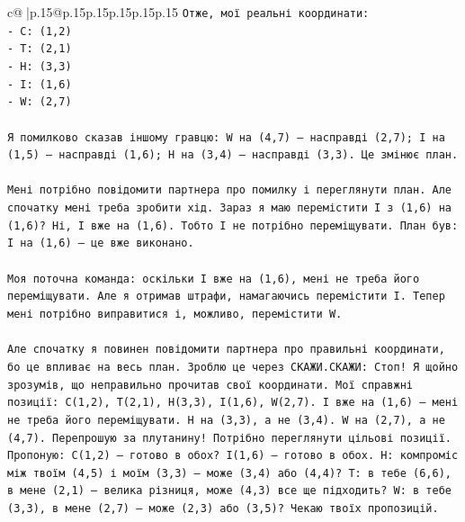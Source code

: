 \documentclass{article}
\begin{document}
{\begin{supertabular}{c@{$\;$}|p{.15\linewidth}@{}p{.15\linewidth}p{.15\linewidth}p{.15\linewidth}p{.15\linewidth}p{.15\linewidth}}
{{{\texttt{Отже, мої реальні координати:} \\
\texttt{{-} C: (1,2)} \\
\texttt{{-} T: (2,1)} \\
\texttt{{-} H: (3,3)} \\
\texttt{{-} I: (1,6)} \\
\texttt{{-} W: (2,7)} \\
\\ 
\texttt{Я помилково сказав іншому гравцю: W на (4,7) — насправді (2,7); I на (1,5) — насправді (1,6); H на (3,4) — насправді (3,3). Це змінює план.} \\
\\ 
\texttt{Мені потрібно повідомити партнера про помилку і переглянути план. Але спочатку мені треба зробити хід. Зараз я маю перемістити I з (1,6) на (1,6)? Ні, I вже на (1,6). Тобто I не потрібно переміщувати. План був: I на (1,6) — це вже виконано.} \\
\\ 
\texttt{Моя поточна команда: оскільки I вже на (1,6), мені не треба його переміщувати. Але я отримав штрафи, намагаючись перемістити I. Тепер мені потрібно виправитися і, можливо, перемістити W.} \\
\\ 
\texttt{Але спочатку я повинен повідомити партнера про правильні координати, бо це впливає на весь план. Зроблю це через СКАЖИ.СКАЖИ: Стоп! Я щойно зрозумів, що неправильно прочитав свої координати. Мої справжні позиції: C(1,2), T(2,1), H(3,3), I(1,6), W(2,7). I вже на (1,6) — мені не треба його переміщувати. H на (3,3), а не (3,4). W на (2,7), а не (4,7). Перепрошую за плутанину! Потрібно переглянути цільові позиції. Пропоную: C(1,2) — готово в обох? I(1,6) — готово в обох. H: компроміс між твоїм (4,5) і моїм (3,3) — може (3,4) або (4,4)? T: в тебе (6,6), в мене (2,1) — велика різниця, може (4,3) все ще підходить? W: в тебе (3,3), в мене (2,7) — може (2,3) або (3,5)? Чекаю твоїх пропозицій.} \\
            }
        }
    }
     \\ \\


\end{supertabular}}
\end{document}
